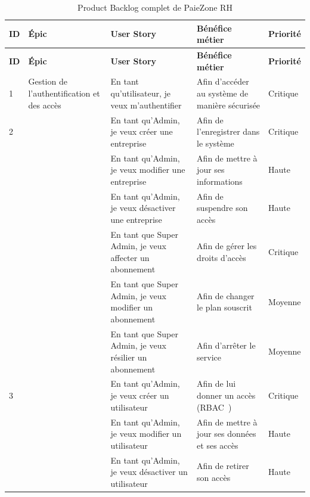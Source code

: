 \begin{xltabular}{\textwidth}{|>{\centering\arraybackslash}p{0.8cm}|>{\raggedright\arraybackslash}p{3.2cm}|>{\raggedright\arraybackslash}X|>{\raggedright\arraybackslash}X|>{\centering\arraybackslash}p{1.6cm}|}
\hline
{}
\textbf{ID} & \textbf{Épic} & \textbf{User Story} & \textbf{Bénéfice métier} & \textbf{Priorité} \\
\hline
\endfirsthead

\hline
{}
\textbf{ID} & \textbf{Épic} & \textbf{User Story} & \textbf{Bénéfice métier} & \textbf{Priorité} \\
\hline
\endhead

\hline
\endfoot

\caption{Product Backlog complet de PaieZone RH}
\label{tab:backlog}
\endlastfoot

1 & Gestion de l'authentification et des accès
  & En tant qu'utilisateur, je veux m'authentifier~\cite{jwt}
  & Afin d'accéder au système de manière sécurisée
  & Critique \\ \hline

2 & 
  & En tant qu'Admin, je veux créer une entreprise
  & Afin de l'enregistrer dans le système
  & Critique \\ 
  & & En tant qu'Admin, je veux modifier une entreprise
  & Afin de mettre à jour ses informations
  & Haute \\ 
  & & En tant qu'Admin, je veux désactiver une entreprise
  & Afin de suspendre son accès
  & Haute \\ 
  & & En tant que Super Admin, je veux affecter un abonnement
  & Afin de gérer les droits d'accès
  & Critique \\ 
  & & En tant que Super Admin, je veux modifier un abonnement
  & Afin de changer le plan souscrit
  & Moyenne \\ 
  & & En tant que Super Admin, je veux résilier un abonnement
  & Afin d'arrêter le service
  & Moyenne \\ \hline

3 & 
  & En tant qu'Admin, je veux créer un utilisateur
  & Afin de lui donner un accès (RBAC~\cite{rbac})
  & Critique \\ 
  & & En tant qu'Admin, je veux modifier un utilisateur
  & Afin de mettre à jour ses données et ses accès
  & Haute \\ 
  & & En tant qu'Admin, je veux désactiver un utilisateur
  & Afin de retirer son accès
  & Haute \\ \hline


\end{xltabular}
